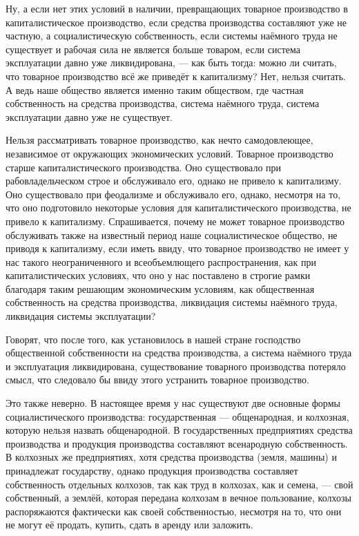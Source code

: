 \documentclass[12pt, a4paper, openany]{book}
\begin{document}
Ну, а если нет этих условий в наличии, превращающих товарное производство в капиталистическое производство, если средства производства составляют уже не частную, а социалистическую собственность, если системы наёмного труда не существует и рабочая сила не является больше товаром, если система эксплуатации давно уже ликвидирована, — как быть тогда: можно ли считать, что товарное производство всё же приведёт к капитализму? Нет, нельзя считать. А ведь наше общество является именно таким обществом, где частная собственность на средства производства, система наёмного труда, система эксплуатации давно уже не существует.



Нельзя рассматривать товарное производство, как нечто самодовлеющее, независимое от окружающих экономических условий. Товарное производство старше капиталистического производства. Оно существовало при рабовладельческом строе и обслуживало его, однако не привело к капитализму. Оно существовало при феодализме и обслуживало его, однако, несмотря на то, что оно подготовило некоторые условия для капиталистического производства, не привело к капитализму. Спрашивается, почему не может товарное производство обслуживать также на известный период наше социалистическое общество, не приводя к капитализму, если иметь ввиду, что товарное производство не имеет у нас такого неограниченного и всеобъемлющего распространения, как при капиталистических условиях, что оно у нас поставлено в строгие рамки благодаря таким решающим экономическим условиям, как общественная собственность на средства производства, ликвидация системы наёмного труда, ликвидация системы эксплуатации?



Говорят, что после того, как установилось в нашей стране господство общественной собственности на средства производства, а система наёмного труда и эксплуатация ликвидирована, существование товарного производства потеряло смысл, что следовало бы ввиду этого устранить товарное производство.



Это также неверно. В настоящее время у нас существуют две основные формы социалистического производства: государственная — общенародная, и колхозная, которую нельзя назвать общенародной. В государственных предприятиях средства производства и продукция производства составляют всенародную собственность. В колхозных же предприятиях, хотя средства производства (земля, машины) и принадлежат государству, однако продукция производства составляет собственность отдельных колхозов, так как труд в колхозах, как и семена, — свой собственный, а землёй, которая передана колхозам в вечное пользование, колхозы распоряжаются фактически как своей собственностью, несмотря на то, что они не могут её продать, купить, сдать в аренду или заложить.
\end{document}
